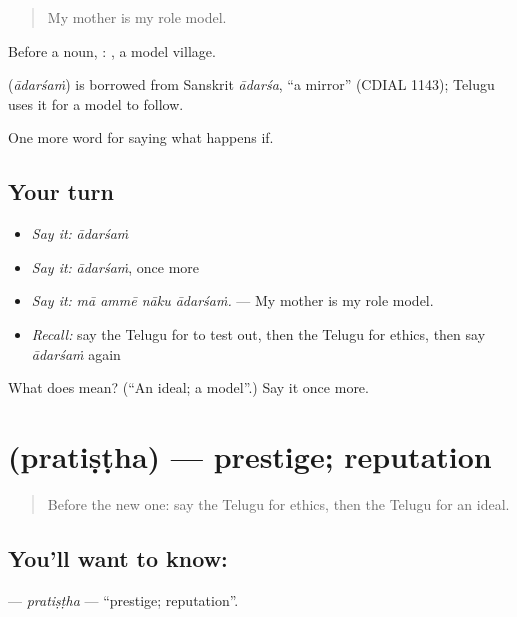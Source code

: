 \begin{quote}
My mother is my role model.
\end{quote}

Before a noun, :  , a model village.

\begin{cousinweb}
\textbf{} (\emph{ādarśaṁ}) is borrowed from Sanskrit \emph{ādarśa}, \textquotedblleft{}a mirror\textquotedblright{} (CDIAL 1143); Telugu uses it for a model to follow.
\end{cousinweb}

\begin{grammarlens}[title={What you've built}]
One more word for saying what happens if.
\end{grammarlens}

\subsection*{Your turn}
\begin{itemize}
\raggedright
  \item \emph{Say it:} \emph{ādarśaṁ}
  \item \emph{Say it:} \emph{ādarśaṁ}, once more
  \item \emph{Say it:} \emph{mā ammē nāku ādarśaṁ.} — My mother is my role model.
  \item \emph{Recall:} say the Telugu for to test out, then the Telugu for ethics, then say \emph{ādarśaṁ} again
\end{itemize}

\begin{tcolorbox}[breakable,colback=teal!4,colframe=teal!35!black,title={Before you move on}]
What does  mean? (\textquotedblleft{}An ideal; a model\textquotedblright{}.) Say it once more.
\end{tcolorbox}
\section[\texorpdfstring{\te{ప్రతిష్ఠ} (pratiṣṭha)}{ప్రతిష్ఠ (pratiṣṭha)}]{ (pratiṣṭha) — prestige; reputation}

\label{lesson:TE-C432-pratistha}



\begin{quote}
Before the new one: say the Telugu for ethics, then the Telugu for an ideal.
\end{quote}

\subsection*{You'll want to know: }
\textbf{} — \emph{pratiṣṭha} — \textquotedblleft{}prestige; reputation\textquotedblright{}.

